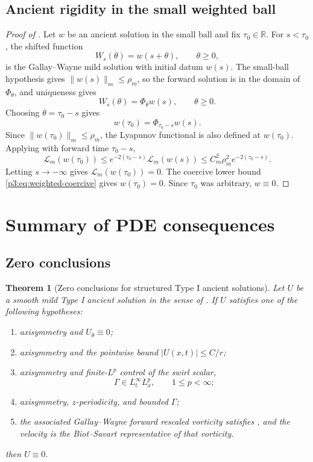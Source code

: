 \documentclass[11pt]{amsart}
\theoremstyle{plain}
\newtheorem{theorem}{Theorem}[section]
\theoremstyle{definition}
\theoremstyle{remark}
\numberwithin{equation}{section}
\begin{document}
\subsection{Ancient rigidity in the small weighted ball}

\begin{proof}[Proof of ]
Let \(w\) be an ancient solution in the small ball and fix
\(\tau_0\in\mathbb R\).  For \(s<\tau_0\), the shifted function
\[
   W_s(\theta)=w(s+\theta),\qquad \theta\ge0,
\]
is the Gallay--Wayne mild solution with initial datum \(w(s)\).  The small-ball
hypothesis gives \(\|w(s)\|_m\le\rho_m\), so the forward solution is in the
domain of \(\Phi_\theta\), and uniqueness gives
\[
   W_s(\theta)=\Phi_\theta w(s),\qquad \theta\ge0.
\]
Choosing \(\theta=\tau_0-s\) gives
\[
   w(\tau_0)=\Phi_{\tau_0-s}w(s).
\]
Since \(\|w(\tau_0)\|_m\le\rho_m\), the Lyapunov functional is also defined at
\(w(\tau_0)\).  Applying  with forward time
\(\tau_0-s\),
\[
   \mathcal L_m(w(\tau_0))
   \le
   e^{-2(\tau_0-s)}\mathcal L_m(w(s))
   \le
   C_m^2\rho_m^2e^{-2(\tau_0-s)} .
\]
Letting \(s\to-\infty\) gives \(\mathcal L_m(w(\tau_0))=0\).  The coercive
lower bound \eqref{p3:eq:weighted-coercive} gives \(w(\tau_0)=0\).  Since
\(\tau_0\) was arbitrary, \(w\equiv0\).
\end{proof}

\section{Summary of PDE consequences}
\label{p3:sec:summary}

\subsection{Zero conclusions}

\begin{theorem}[Zero conclusions for structured Type I ancient solutions]
\label{p3:thm:typeI-zero-hypotheses}
Let \(U\) be a smooth mild Type I ancient solution in the sense of
.  If \(U\) satisfies one of the following
hypotheses:
\begin{enumerate}[label=\textup{(\roman*)}]
\item axisymmetry and \(U_\theta\equiv0\);
\item axisymmetry and the pointwise bound \(|U(x,t)|\le C/r\);
\item axisymmetry and finite-\(L^p\) control of the swirl scalar,
\[
   \Gamma\in L_t^\infty L_x^p,\qquad 1\le p<\infty;
\]
\item axisymmetry, \(z\)-periodicity, and bounded \(\Gamma\);
\item the associated Gallay--Wayne forward rescaled vorticity satisfies
, and the velocity is the
Biot--Savart representative of that vorticity.
\end{enumerate}
then \(U\equiv0\).
\end{theorem}
\end{document}
